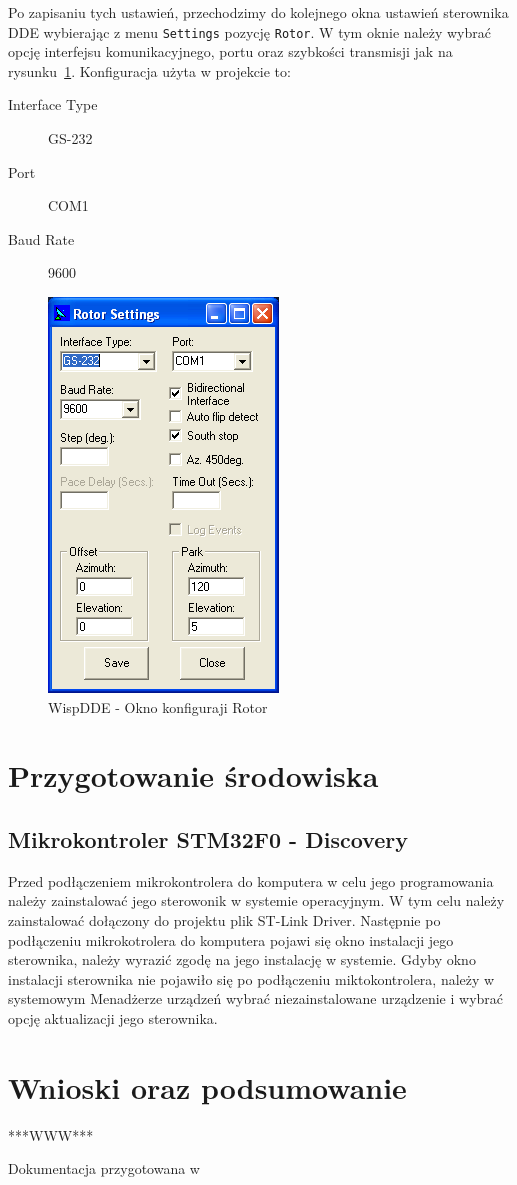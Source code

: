 \documentclass[12pt,a4paper]{article}
\begin{document}
		Po zapisaniu tych ustawień, przechodzimy do kolejnego okna ustawień sterownika DDE wybierając z menu \texttt{Settings} pozycję \texttt{Rotor}. W tym oknie należy wybrać opcję interfejsu komunikacyjnego, portu oraz szybkości transmisji jak na rysunku~\ref{fig:WispDDE_Rotor_settings}. Konfiguracja użyta w projekcie to:
		\begin{description}
			\item[Interface Type] GS-232
			\item[Port] COM1
			\item[Baud Rate] 9600
		\end{description}
		
		\begin{figure}[!htb]
			\begin{center}
				\includegraphics[scale=0.5]{screen5}
			\end{center}
			\caption{WispDDE - Okno konfiguraji Rotor}
			\label{fig:WispDDE_Rotor_settings}
		\end{figure}

	\section{Przygotowanie środowiska}

		\subsection{Mikrokontroler STM32F0 - Discovery}
		Przed podłączeniem mikrokontrolera do komputera w celu jego programowania należy zainstalować jego sterowonik w systemie operacyjnym. W tym celu należy zainstalować dołączony do projektu plik ST-Link Driver. Następnie po podłączeniu mikrokotrolera do komputera pojawi się okno instalacji jego sterownika, należy wyrazić zgodę na jego instalację w systemie. Gdyby okno instalacji sterownika nie pojawiło się po podłączeniu miktokontrolera, należy w systemowym Menadżerze urządzeń wybrać niezainstalowane urządzenie i wybrać opcję aktualizacji jego sterownika.

	\section{Wnioski oraz podsumowanie}
	***WWW***

	\clearpage
	\listoffigures

	\vfill
	\hfill Dokumentacja przygotowana w \LaTeXe
\end{document}
